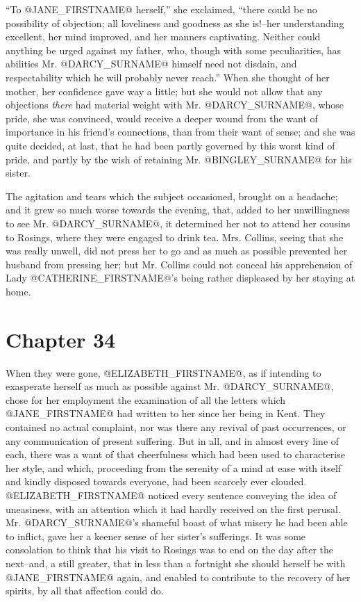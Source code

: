 ``To @JANE_FIRSTNAME@ herself,'' she exclaimed, ``there could be no possibility of
objection; all loveliness and goodness as she is!--her understanding
excellent, her mind improved, and her manners captivating. Neither
could anything be urged against my father, who, though with some
peculiarities, has abilities Mr. @DARCY_SURNAME@ himself need not disdain, and
respectability which he will probably never reach.'' When she thought of
her mother, her confidence gave way a little; but she would not allow
that any objections \textit{there} had material weight with Mr. @DARCY_SURNAME@, whose
pride, she was convinced, would receive a deeper wound from the want of
importance in his friend's connections, than from their want of sense;
and she was quite decided, at last, that he had been partly governed
by this worst kind of pride, and partly by the wish of retaining Mr.
@BINGLEY_SURNAME@ for his sister.

The agitation and tears which the subject occasioned, brought on a
headache; and it grew so much worse towards the evening, that, added to
her unwillingness to see Mr. @DARCY_SURNAME@, it determined her not to attend her
cousins to Rosings, where they were engaged to drink tea. Mrs. Collins,
seeing that she was really unwell, did not press her to go and as much
as possible prevented her husband from pressing her; but Mr. Collins
could not conceal his apprehension of Lady @CATHERINE_FIRSTNAME@'s being rather
displeased by her staying at home.



\chapter*{Chapter 34}


When they were gone, @ELIZABETH_FIRSTNAME@, as if intending to exasperate herself
as much as possible against Mr. @DARCY_SURNAME@, chose for her employment the
examination of all the letters which @JANE_FIRSTNAME@ had written to her since her
being in Kent. They contained no actual complaint, nor was there any
revival of past occurrences, or any communication of present suffering.
But in all, and in almost every line of each, there was a want of that
cheerfulness which had been used to characterise her style, and which,
proceeding from the serenity of a mind at ease with itself and kindly
disposed towards everyone, had been scarcely ever clouded. @ELIZABETH_FIRSTNAME@
noticed every sentence conveying the idea of uneasiness, with an
attention which it had hardly received on the first perusal. Mr. @DARCY_SURNAME@'s
shameful boast of what misery he had been able to inflict, gave her
a keener sense of her sister's sufferings. It was some consolation
to think that his visit to Rosings was to end on the day after the
next--and, a still greater, that in less than a fortnight she should
herself be with @JANE_FIRSTNAME@ again, and enabled to contribute to the recovery of
her spirits, by all that affection could do.

